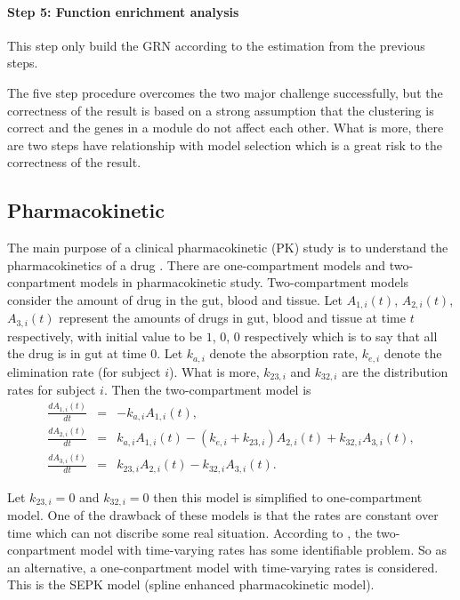 \documentclass[12pt]{extarticle}
\begin{document}
\paragraph{Step 5: Function enrichment analysis}
This step only build the GRN according to the estimation from the previous steps.

The five step procedure overcomes the two major challenge successfully, but the correctness of the result is based on a strong assumption that the clustering is correct and the genes in a module do not affect each other. What is more, there are two steps have relationship with model selection which is a great risk to the correctness of the result.

\subsection{Pharmacokinetic}
\label{sect:pharmacokinetic}
The main purpose of a clinical pharmacokinetic (PK) study is to understand the pharmacokinetics of a drug \cite{Li02}. There are one-compartment models and two-conpartment models in pharmacokinetic study. Two-compartment models consider the amount of drug in the gut, blood and tissue. Let $A_{1,i}(t)$, $A_{2,i}(t)$, $A_{3,i}(t)$ represent the amounts of drugs in gut, blood and tissue at time $t$ respectively, with initial value to be $1$, $0$, $0$ respectively which is to say that all the drug is in gut at time $0$. Let $k_{a,i}$ denote the absorption rate, $k_{e,i}$ denote the elimination rate (for subject $i$). What is more, $k_{23,i}$ and $k_{32,i}$ are the distribution rates for subject $i$. Then the two-compartment model is
\begin{equation}
\begin{array}{rcl}
\frac{dA_{1,i}(t)}{dt} & = & -k_{a,i}A_{1,i}(t), \\
\frac{dA_{2,i}(t)}{dt} & = & k_{a,i}A_{1,i}(t) - (k_{e,i}+k_{23,i})A_{2,i}(t)+k_{32,i}A_{3,i}(t), \\
\frac{dA_{3,i}(t)}{dt} & = & k_{23,i}A_{2,i}(t)-k_{32,i}A_{3,i}(t).
\end{array}
\end{equation}

Let $k_{23,i}=0$ and $k_{32,i}=0$ then this model is simplified to one-compartment model. 
One of the drawback of these models is that the rates are constant over time which can not discribe some real situation. According to \cite{Li02}, the two-conpartment model with time-varying rates has some identifiable problem. So as an alternative, a one-conpartment model with time-varying rates is considered. This is the SEPK model (spline enhanced pharmacokinetic model).
\end{document}
